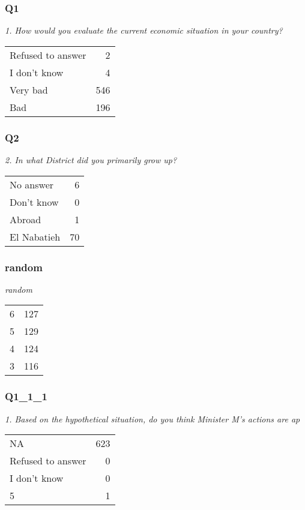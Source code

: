 \documentclass[
]{article}
\begin{document}
\hypertarget{q1-1}{%
\subsubsection{Q1}\label{q1-1}}

\textit{1. How would you evaluate the current economic situation in your country?}

\begin{longtable}[]{@{}lr@{}}
\toprule
\endhead
Refused to answer & 2\tabularnewline
I don't know & 4\tabularnewline
Very bad & 546\tabularnewline
Bad & 196\tabularnewline
\bottomrule
\end{longtable}

\hypertarget{q2-1}{%
\subsubsection{Q2}\label{q2-1}}

\textit{2. In what District did you primarily grow up?}

\begin{longtable}[]{@{}lr@{}}
\toprule
\endhead
No answer & 6\tabularnewline
Don't know & 0\tabularnewline
Abroad & 1\tabularnewline
El Nabatieh & 70\tabularnewline
\bottomrule
\end{longtable}

\hypertarget{random-1}{%
\subsubsection{random}\label{random-1}}

\textit{random}

\begin{longtable}[]{@{}lr@{}}
\toprule
\endhead
6 & 127\tabularnewline
5 & 129\tabularnewline
4 & 124\tabularnewline
3 & 116\tabularnewline
\bottomrule
\end{longtable}

\hypertarget{q1_1_1-1}{%
\subsubsection{Q1\_1\_1}\label{q1_1_1-1}}

\textit{1. Based on the hypothetical situation, do you think Minister M’s actions are ap}

\begin{longtable}[]{@{}lr@{}}
\toprule
\endhead
NA & 623\tabularnewline
Refused to answer & 0\tabularnewline
I don't know & 0\tabularnewline
5 & 1\tabularnewline
\bottomrule
\end{longtable}
\end{document}
